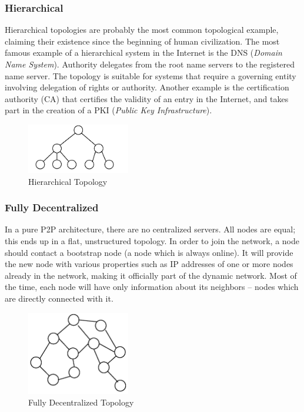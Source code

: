 \subsubsection{Hierarchical}

Hierarchical topologies are probably the most common topological example,
claiming their existence since the beginning of human civilization. The most
famous example of a hierarchical system in the Internet is the DNS
(\textit{Domain Name System}). Authority delegates from the root name servers
to the registered name server. The topology is suitable for systems that
require a governing entity involving delegation of rights or authority.
Another example is the certification authority (CA) that certifies the
validity of an entry in the Internet, and takes part in the creation of a PKI
(\textit{Public Key Infrastructure}).

\begin{figure}
  \centering
  \includegraphics[width=0.4\textwidth]{src/img/p2p-systems/hierarchical}
  \caption{Hierarchical Topology}
  \label{fig:p2p-systems:hierarchical}
\end{figure}

\subsubsection{Fully Decentralized}

In a pure P2P architecture, there are no centralized servers. All nodes are
equal; this ends up in a flat, unstructured topology. In order to join the
network, a node should contact a bootstrap node (a node which is always online).
It will provide the new node with various properties such as IP addresses of
one or more nodes already in the network, making it officially part of the
dynamic network. Most of the time, each node will have only information about
its neighbors -- nodes which are directly connected with it.

\begin{figure}
  \centering
  \includegraphics[width=0.4\textwidth]{src/img/p2p-systems/decentralized}
  \caption{Fully Decentralized Topology}
  \label{fig:p2p-systems:decentralized}
\end{figure}

